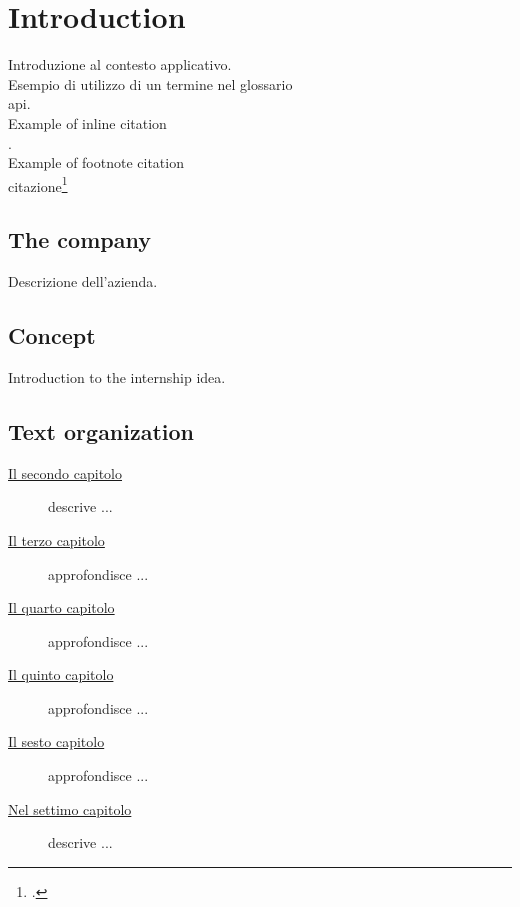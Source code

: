 
\chapter{Introduction}
\label{cap:introduzione}

Introduzione al contesto applicativo.\\

\noindent Esempio di utilizzo di un termine nel glossario \\
\gls{api}. \\

\noindent Example of inline citation \\
\cite{site:agile-manifesto}. \\

\noindent Example of footnote citation  \\
citazione\footcite{womak:lean-thinking} \\

\section{The company}

Descrizione dell'azienda.

\section{Concept}

Introduction to the internship idea.

\section{Text organization}

\begin{description}
    \item[{\hyperref[cap:processi-metodologie]{Il secondo capitolo}}] descrive ...
    
    \item[{\hyperref[cap:descrizione-stage]{Il terzo capitolo}}] approfondisce ...
    
    \item[{\hyperref[cap:analisi-requisiti]{Il quarto capitolo}}] approfondisce ...
    
    \item[{\hyperref[cap:progettazione-codifica]{Il quinto capitolo}}] approfondisce ...
    
    \item[{\hyperref[cap:verifica-validazione]{Il sesto capitolo}}] approfondisce ...
    
    \item[{\hyperref[cap:conclusioni]{Nel settimo capitolo}}] descrive ...
\end{description}

